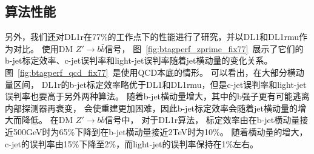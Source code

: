 \subsection{算法性能}
\label{sec:DijetBtagging2}

另外，我们还对DL1r在77\%的工作点下的性能进行了研究，并以DL1和DL1rmu作为对比。
使用DM $Z\prime\rightarrow b\bar{b}$信号，
图~\ref{fig:btagperf_zprime_fix77}~展示了它们的b-jet标定效率、c-jet误判率和light-jet误判率随着jet横动量的变化关系。
图~\ref{fig:btagperf_qcd_fix77}~是使用QCD本底的情形。
可以看出，在大部分横动量区间，
DL1r的b-jet标定效率略优于DL1和DL1rmu，但是c-jet误判率和light-jet误判率也要高于另外两种算法。
随着b-jet横动量增大，其中的b强子更有可能逃离内部探测器再衰变，
会使重建更加困难，因此b-jet标定效率会随着jet横动量的增大而降低。
在DM $Z\prime\rightarrow b\bar{b}$信号中，
对于DL1r算法，
标定效率由在b-jet横动量接近500GeV时为65\%下降到在b-jet横动量接近2TeV时为10\%。
随着横动量的增大，c-jet的误判率由15\%下降至2\%，而light-jet的误判率保持在1\%左右。


